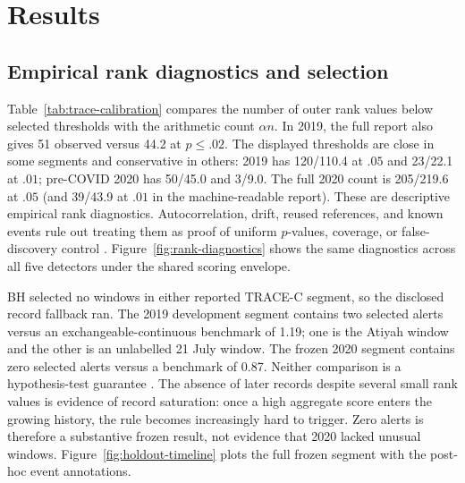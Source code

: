 \section{Results}
\label{sec:results}

\subsection{Empirical rank diagnostics and selection}

Table~\ref{tab:trace-calibration} compares the number of outer rank values below
selected thresholds with the arithmetic count $\alpha n$. In 2019, the full
report also gives 51 observed versus 44.2 at $p\leq.02$. The displayed
thresholds are close in some segments and conservative in others: 2019 has
120/110.4 at $.05$ and 23/22.1 at $.01$; pre-COVID 2020 has 50/45.0 and 3/9.0.
The full 2020 count is 205/219.6 at $.05$ (and 39/43.9 at $.01$ in the
machine-readable report). These are descriptive empirical rank diagnostics.
Autocorrelation, drift, reused references, and known events rule out treating
them as proof of uniform $p$-values, coverage, or false-discovery control
\citep{shafer2008tutorial,bates2023conformaloutliers}.
Figure~\ref{fig:rank-diagnostics} shows the same diagnostics across all five
detectors under the shared scoring envelope.



BH selected no windows in either reported TRACE-C segment, so the disclosed
record fallback ran. The 2019 development segment contains two selected alerts
versus an exchangeable-continuous benchmark of 1.19; one is the Atiyah window
and the other is an unlabelled 21 July window. The frozen 2020 segment contains
zero selected alerts versus a benchmark of 0.87. Neither comparison is a
hypothesis-test guarantee \citep{renyi1962records}. The absence of later records
despite several small rank values is evidence of record saturation: once a high
aggregate score enters the growing history, the rule becomes increasingly hard
to trigger. Zero alerts is therefore a substantive frozen result, not evidence
that 2020 lacked unusual windows. Figure~\ref{fig:holdout-timeline} plots the
full frozen segment with the post-hoc event annotations.



\begingroup
{}

\endgroup

